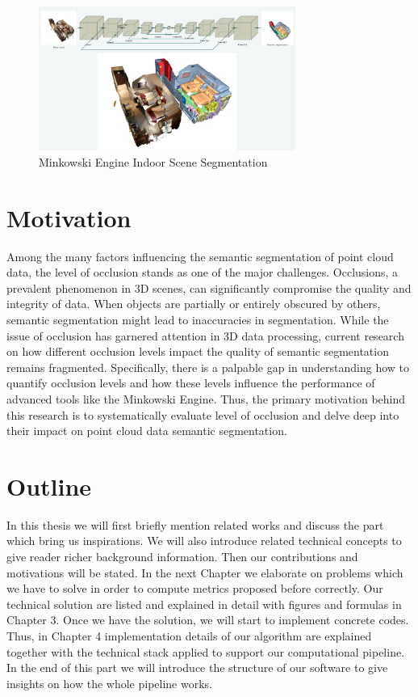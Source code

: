 \documentclass[11pt, a4paper,oneside,chapterprefix=false]{scrbook}
\begin{document}
\begin{figure}[h]
    \centering
    \includegraphics*[width=0.75\textwidth]{figures/Minkowski Engine.png}
    \caption{Minkowski Engine Indoor Scene Segmentation}
    \label{fig:minkowski}
\end{figure}


\section{Motivation} \label{sec:motivation}

Among the many factors influencing the semantic segmentation of point cloud data, the level of occlusion stands as one of the major challenges. Occlusions, a prevalent phenomenon in 3D scenes, can significantly compromise the quality and integrity of data. When objects are partially or entirely obscured by others, semantic segmentation might lead to inaccuracies in segmentation. While the issue of occlusion has garnered attention in 3D data processing, current research on how different occlusion levels impact the quality of semantic segmentation remains fragmented. Specifically, there is a palpable gap in understanding how to quantify occlusion levels and how these levels influence the performance of advanced tools like the Minkowski Engine. Thus, the primary motivation behind this research is to systematically evaluate level of occlusion and delve deep into their impact on point cloud data semantic segmentation.

\section{Outline} \label{sec:outline}

In this thesis we will first briefly mention related works and discuss the part which bring us inspirations. We will also introduce related technical concepts to give reader richer background information. Then our contributions and motivations will be stated. In the next Chapter we elaborate on problems which we have to solve in order to compute metrics proposed before correctly. Our technical solution are listed and explained in detail with figures and formulas in Chapter 3. Once we have the solution, we will start to implement concrete codes. Thus, in Chapter 4 implementation details of our algorithm are explained together with the technical stack applied to support our computational pipeline. In the end of this part we will introduce the structure of our software to give insights on how the whole pipeline works.
\end{document}
